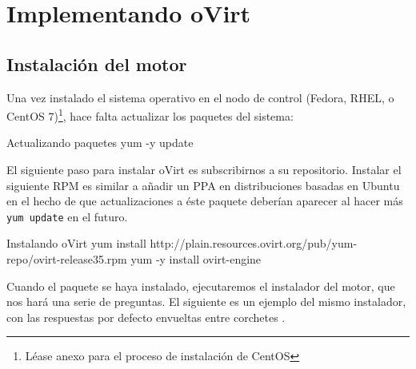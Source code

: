 \chapter{Implementando oVirt}
\label{sec:ovirt}

\section{Instalación del motor}
\label{sec:ovirt_install}

Una vez instalado el sistema operativo en el nodo de control (Fedora, RHEL, o CentOS 7)\footnote{Léase anexo para el proceso de instalación de CentOS}, hace falta actualizar los paquetes del sistema:

\begin{TMterminal}{}{}{Actualizando paquetes}
  yum -y update
\end{TMterminal}

El siguiente paso para instalar oVirt es subscribirnos a su repositorio. Instalar el siguiente RPM es similar a añadir un PPA en distribuciones basadas en Ubuntu en el hecho de que actualizaciones a éste paquete deberían aparecer al hacer más \texttt{yum update} en el futuro.

\begin{TMterminal}{}{}{Instalando oVirt}
  yum install http://plain.resources.ovirt.org/pub/yum-repo/ovirt-release35.rpm
  yum -y install ovirt-engine
\end{TMterminal}

Cuando el paquete se haya instalado, ejecutaremos el instalador del motor, que nos hará una serie de preguntas. El siguiente es un ejemplo del mismo instalador, con las respuestas por defecto envueltas entre corchetes \cite{ovirt}.

